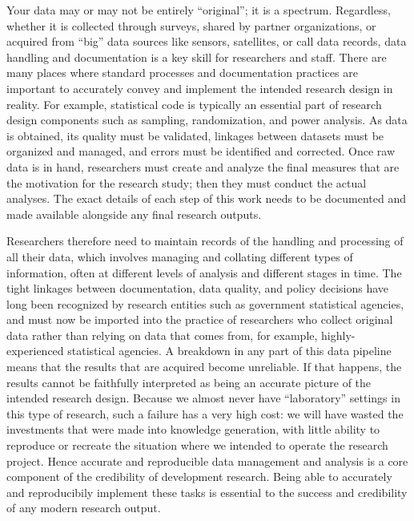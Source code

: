 Your data may or may not be entirely ``original''; it is a spectrum.
Regardless, whether it is collected through surveys, shared by partner organizations,
or acquired from ``big'' data sources like sensors, satellites, or call data records,
data handling and documentation is a key skill for researchers and staff.
There are many places where standard processes and documentation practices
are important to accurately convey and implement the intended research design in reality.
For example, statistical code is typically an essential part of
research design components such as sampling, randomization, and power analysis.
As data is obtained, its quality must be validated,
linkages between datasets must be organized and managed,
and errors must be identified and corrected.
Once raw data is in hand, researchers must create and analyze the final measures that
are the motivation for the research study;
then they must conduct the actual analyses.
The exact details of each step of this work needs to be documented and made available
alongside any final research outputs.

Researchers therefore need to maintain records of the handling and processing of all their data,
which involves managing and collating different types of information,
often at different levels of analysis and different stages in time.
The tight linkages between documentation, data quality, and policy decisions
have long been recognized by research entities such as government statistical agencies,\cite{jepdataquality}
and must now be imported into the practice of researchers who collect original data
rather than relying on data that comes from, for example, highly-experienced statistical agencies.
A breakdown in any part of this data pipeline
means that the results that are acquired become unreliable.\cite{mccullough2008economics}
If that happens, the results cannot be faithfully interpreted
as being an accurate picture of the intended research design.
Because we almost never have ``laboratory'' settings in this type of research,
such a failure has a very high cost:
we will have wasted the investments that were made into knowledge generation,
with little ability to reproduce or recreate the situation
where we intended to operate the research project.\cite{camerer2016evaluating}
Hence accurate and reproducible data management and analysis is a core component
of the credibility of development research.\cite{vilhuber_lars_2020_3911311}
Being able to accurately and reproducibily implement these tasks
is essential to the success and credibility of any modern research output.

